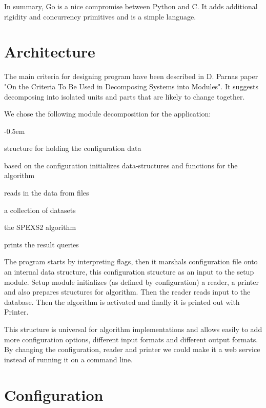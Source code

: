In summary, Go is a nice compromise between Python and C. It adds additional rigidity and concurrency primitives and is a simple language.

\section{Architecture}

The main criteria for designing program have been described in D. Parnas
paper "On the Criteria To Be Used in Decomposing Systems into Modules"\cite{Parnas72}. It suggests decomposing into isolated units and parts that are likely to change together.

We chose the following module decomposition for the application:

\begin{small}
\begin{description}
    \itemsep-0.5em
    \item[Configuration] structure for holding the configuration data
    \item[Setup] based on the configuration initializes data-structures and functions for the algorithm
    \item[Reader] reads in the data from files
    \item[Database] a collection of datasets
    \item[Algorithm] the SPEXS2 algorithm
    \item[Printer] prints the result queries
\end{description}
\end{small}

The program starts by interpreting flags, then it marshals configuration file onto an internal data structure, this configuration structure as an input to the setup module. Setup module initializes (as defined by configuration) a reader, a printer and also prepares structures for algorithm. Then the reader reads input to the database. Then the algorithm is activated and finally it is printed out with Printer.

This structure is universal for algorithm implementations and allows easily to add more configuration options, different input formats and different output formats. By changing the configuration, reader and printer we could make it a web service instead of running it on a command line.

\section{Configuration}

